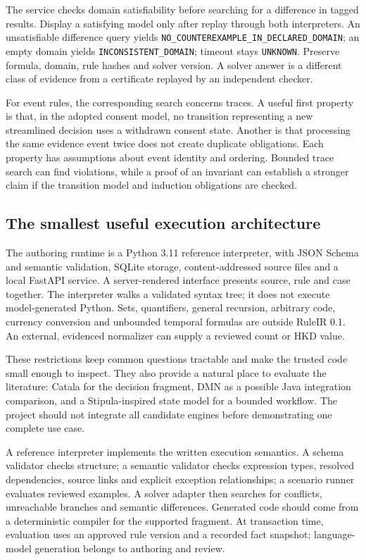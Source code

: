 The service checks domain satisfiability before searching for a difference in
tagged results. Display a satisfying model only after replay through both
interpreters. An unsatisfiable difference query yields
\texttt{NO\_COUNTEREXAMPLE\_IN\_DECLARED\_DOMAIN}; an empty domain yields
\texttt{INCONSISTENT\_DOMAIN}; timeout stays \texttt{UNKNOWN}. Preserve formula,
domain, rule hashes and solver version. A solver answer is a different class
of evidence from a certificate replayed by an independent checker.

For event rules, the corresponding search concerns traces. A useful first
property is that, in the adopted consent model, no transition representing a new
streamlined decision uses a withdrawn consent state. Another is that processing
the same evidence event twice does not create duplicate obligations. Each
property has assumptions about event identity and ordering. Bounded trace search
can find violations, while a proof of an invariant can establish a stronger
claim if the transition model and induction obligations are checked.

\subsection{The smallest useful execution architecture}

The authoring runtime is a Python 3.11 reference interpreter, with JSON Schema and
semantic validation, SQLite storage, content-addressed source files and a local
FastAPI service. A server-rendered interface presents source, rule and case
together. The interpreter walks a validated syntax tree; it does not execute
model-generated Python. Sets, quantifiers, general recursion, arbitrary code,
currency conversion and unbounded temporal formulas are outside RuleIR 0.1.
An external, evidenced normalizer can supply a reviewed count or HKD value.

These restrictions keep common questions tractable and make the trusted code
small enough to inspect. They also provide a natural place to evaluate the
literature: Catala for the decision fragment, DMN as a possible Java integration comparison,
and a Stipula-inspired state model for a bounded workflow. The project should not
integrate all candidate engines before demonstrating one complete use case.

A reference interpreter implements the written execution semantics. A schema
validator checks structure; a semantic validator checks expression types,
resolved dependencies,
source links and explicit exception relationships; a scenario runner evaluates
reviewed examples. A solver adapter then searches for conflicts, unreachable
branches and semantic differences. Generated code should come from a deterministic
compiler for the supported fragment. At transaction time, evaluation uses an
approved rule version and a recorded fact snapshot; language-model generation
belongs to authoring and review.

